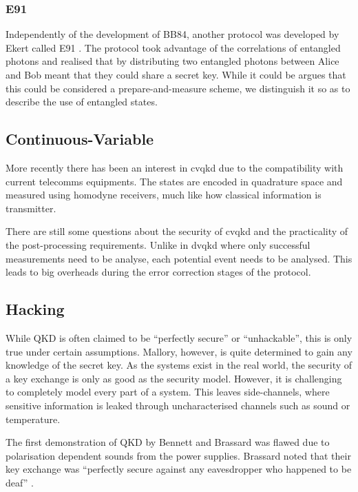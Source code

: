 \subsubsection*{E91}

Independently of the development of BB84, another protocol was developed by Ekert called E91 \cite{E91}. The protocol took advantage of the correlations of entangled photons and realised that by distributing two entangled photons between Alice and Bob meant that they could share a secret key. While it could be argues that this could be considered a prepare-and-measure scheme, we distinguish it so as to describe the use of entangled states.

\subsection{Continuous-Variable}

More recently there has been an interest in \ac{cvqkd} due to the compatibility with current telecomms equipments. The states are encoded in quadrature space and measured using homodyne receivers, much like how classical information is transmitter.

There are still some questions about the security of \ac{cvqkd} and the practicality of the post-processing requirements. Unlike in \ac{dvqkd} where only successful measurements need to be analyse, each potential event needs to be analysed. This leads to big overheads during the error correction stages of the protocol.

\subsection{Hacking}

While \ac{QKD} is often claimed to be ``perfectly secure'' or ``unhackable'', this is only true under certain assumptions.  Mallory, however, is quite determined to gain any knowledge of the secret key. As the systems exist in the real world, the security of a key exchange is only as good as the security model. However, it is challenging to completely model every part of a system. This leaves side-channels, where sensitive information is leaked through uncharacterised channels such as sound or temperature.

The first demonstration of \ac{QKD} by Bennett and Brassard was flawed due to polarisation dependent sounds from the power supplies. Brassard noted that their key exchange was ``perfectly secure against any eavesdropper who happened to be deaf'' \cite{Brassard2005}. 

